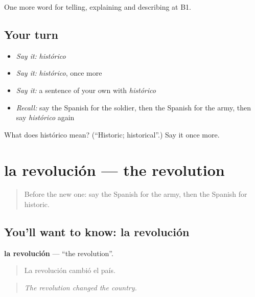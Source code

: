 \begin{grammarlens}[title={What you've built}]
One more word for telling, explaining and describing at B1.
\end{grammarlens}

\subsection*{Your turn}
\begin{itemize}
\raggedright
  \item \emph{Say it:} \emph{histórico}
  \item \emph{Say it:} \emph{histórico}, once more
  \item \emph{Say it:} a sentence of your own with \emph{histórico}
  \item \emph{Recall:} say the Spanish for the soldier, then the Spanish for the army, then say \emph{histórico} again
\end{itemize}

\begin{tcolorbox}[breakable,colback=teal!4,colframe=teal!35!black,title={Before you move on}]
What does histórico mean? (\textquotedblleft{}Historic; historical\textquotedblright{}.) Say it once more.
\end{tcolorbox}
\section[la revolución]{la revolución — the revolution}

\label{lesson:ES-C568-revolucion}



\begin{quote}
Before the new one: say the Spanish for the army, then the Spanish for historic.
\end{quote}

\subsection*{You'll want to know: la revolución}
\textbf{la revolución} — \textquotedblleft{}the revolution\textquotedblright{}.

\begin{quote}
La revolución cambió el país.
\end{quote}

\begin{quote}
\emph{The revolution changed the country.}
\end{quote}

